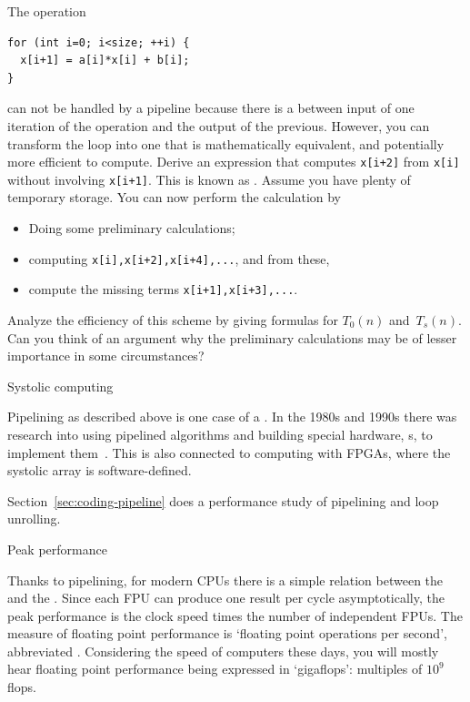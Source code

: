 \begin{exercise}
\label{ex:recursivedoubling}
  The operation
\begin{lstlisting}
for (int i=0; i<size; ++i) {
  x[i+1] = a[i]*x[i] + b[i];
}
\end{lstlisting}
  can not be handled by a pipeline because there is
  a  between input of one iteration of the operation
  and the output of the previous.
  However, you can transform the loop into one that is mathematically
  equivalent, and potentially more efficient to compute. Derive an
  expression that computes \texttt{x[i+2]} from \texttt{x[i]} without
  involving \texttt{x[i+1]}. This is known as . Assume you have plenty of temporary storage. You can now
  perform the calculation by
  \begin{itemize}
  \item Doing some preliminary calculations;
  \item computing \texttt{x[i],x[i+2],x[i+4],...}, and from these,
  \item compute the missing terms \texttt{x[i+1],x[i+3],...}.
  \end{itemize}
  Analyze the efficiency of this scheme by giving formulas for
  $T_0(n)$ and~$T_s(n)$. Can you think of an argument
  why the preliminary calculations may be of lesser importance in some
  circumstances?
\end{exercise}

 {Systolic computing}

Pipelining as described above is one case of a
. In the 1980s and 1990s there was
research into using pipelined algorithms and building special
hardware, s, to implement
them~\cite{Ku:systolic}. This is also connected to computing with
\acp{FPGA}, where the systolic array is software-defined.

Section~\ref{sec:coding-pipeline} does a performance study
of pipelining and loop unrolling.


 {Peak performance}

Thanks to pipelining, for modern \acp{CPU} there is a simple relation
between the  and the .
Since each \ac{FPU} can produce one result per cycle
asymptotically, the peak performance is the clock speed times the
number of independent \acp{FPU}. The measure of floating
point performance is `floating point operations per second',
abbreviated . Considering the speed of computers
these days, you will mostly hear floating point performance being
expressed in `gigaflops': multiples of $10^9$ flops.

